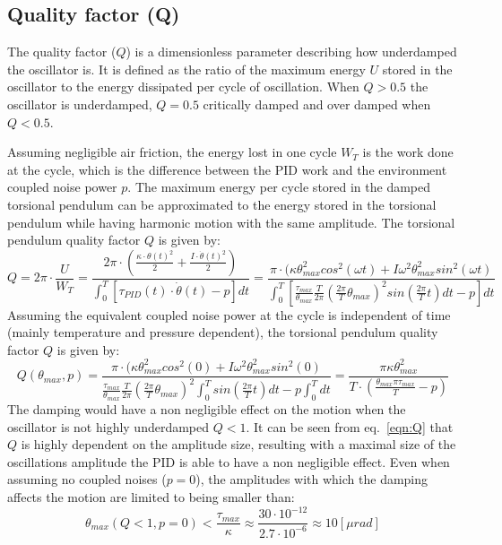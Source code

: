 \documentclass[\main/master.tex]{subfiles}
\begin{document}
\subsection{Quality factor (Q)}
The quality factor ($Q$) is a dimensionless parameter describing how underdamped the oscillator is. It is defined as the ratio of the maximum energy $U$ stored in the oscillator to the energy dissipated per cycle of oscillation. When $Q > 0.5$ the oscillator is underdamped, $Q = 0.5$ critically damped and over damped when $Q < 0.5$.
\par\noindent
Assuming negligible air friction, the energy lost in one cycle  $W_T$ is the work done at the cycle, which is the difference between the PID work and the environment coupled noise power $p$. The maximum energy per cycle stored in the damped torsional pendulum can be approximated to the energy stored in the torsional pendulum while having harmonic motion with the same amplitude. The torsional pendulum quality factor $Q$ is given by:
\begin{equation}
Q = 2\pi\cdot \frac{U}{W_T}=  \frac{2\pi\cdot(\frac{\kappa\cdot\theta(t)^2}{2}+\frac{I\cdot\dot{\theta}(t)^2}{2})}{\int_0^T[\tau_{PID}(t)\cdot\dot{\theta}(t) - p]dt} = \frac{\pi\cdot(\kappa\theta_{max}^2cos^2(\omega t)+I\omega^2\theta_{max}^2sin^2(\omega t) }{\int_0^T[\frac{\tau_{max} }{\theta_{max}} \frac{ T}{2\pi}(\frac{2\pi}{T}\theta_{max})^2 sin(\frac{2\pi}{T}t)dt-p] dt }
\label{eqn:Q}
\end{equation}
Assuming the equivalent coupled noise power at the cycle is independent of time (mainly temperature and pressure dependent), the torsional pendulum quality factor $Q$ is given by:
\begin{equation}
Q(\theta_{max},p) =  \frac{\pi\cdot(\kappa\theta_{max}^2cos^2(0)+I\omega^2\theta_{max}^2sin^2( 0) }{\frac{\tau_{max} }{\theta_{max}} \frac{ T}{2\pi}(\frac{2\pi}{T}\theta_{max})^2\int_0^T sin(\frac{2\pi}{T}t)dt-p\int_0^T dt }  =  \frac{\pi\kappa\theta_{max}^2}{T\cdot(\frac{\theta_{max}\pi\tau_{max}}{T} -p)} 
\label{eqn:Q}
\end{equation}
The damping would have a non negligible effect on the motion when the oscillator is not highly underdamped $Q < 1$. It can be seen from eq.~\ref{eqn:Q} that $Q$ is highly dependent on the amplitude size, resulting with a maximal size of the oscillations amplitude the PID is able to have a non negligible effect. Even when assuming no coupled noises ($p=0$), the amplitudes with which the damping affects the motion are limited to being smaller than:  
\begin{equation}
\theta_{max}(Q<1,p=0) < \frac{\tau_{max}}{\kappa} \approx \frac{30\cdot 10^{-12}}{2.7\cdot 10^{-6}} \approx 10 [\mu rad]
\label{eqn:low Q}
\end{equation}
\end{document}
